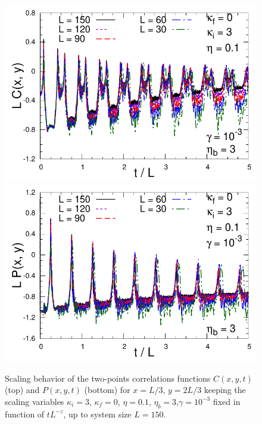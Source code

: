 \documentclass[pra,twocolumn,preprintnumbers,amsmath,amssymb,nofootinbib,floatfix,longbibliography]{revtex4}
\begin{document}
\begin{figure}[!htb]
  \includegraphics[width=0.95\columnwidth]
    {figs/LCk3q0e010t300g0001.pdf}
  \includegraphics[width=0.95\columnwidth]
    {figs/LPk3q0e010t300g0001.pdf}
  \caption{Scaling behavior of the two-points
    correlations functions $C(x,y,t)$ (top) and $P(x,y,t)$
    (bottom) for $x=L/3$, $y=2L/3$  keeping the scaling
    variables $\kappa_i=3$, $\kappa_f=0$, $\eta=0.1$,
    $\eta_b=3$,$\gamma=10^{-3}$ fixed in function of
    $tL^{-z}$, up to system size $L=150$.}
  \label{k3q0e010t300g0001}
\end{figure}







%
\end{document}
